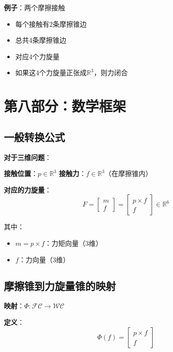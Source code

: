 \documentclass[12pt,a4paper]{article}
\begin{document}
\textbf{例子}：两个摩擦接触
\begin{itemize}
\item 每个接触有2条摩擦锥边
\item 总共4条摩擦锥边
\item 对应4个力旋量
\item 如果这4个力旋量正张成$\mathbb{R}^3$，则力闭合
\end{itemize}

\section{第八部分：数学框架}

\subsection{一般转换公式}

\textbf{对于三维问题}：

\textbf{接触位置}：$p \in \mathbb{R}^3$
\textbf{接触力}：$f \in \mathbb{R}^3$（在摩擦锥内）

\textbf{对应的力旋量}：
\begin{equation}
F = \begin{bmatrix} m \\ f \end{bmatrix} = \begin{bmatrix} p \times f \\ f \end{bmatrix} \in \mathbb{R}^6
\end{equation}

其中：
\begin{itemize}
\item $m = p \times f$：力矩向量（3维）
\item $f$：力向量（3维）
\end{itemize}

\subsection{摩擦锥到力旋量锥的映射}

\textbf{映射}：$\Phi: \mathcal{FC} \to \mathcal{WC}$

\textbf{定义}：
\begin{equation}
\Phi(f) = \begin{bmatrix} p \times f \\ f \end{bmatrix}
\end{equation}
\end{document}
